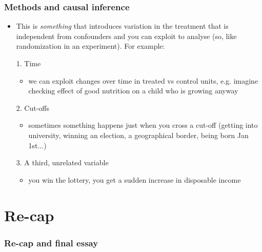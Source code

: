 \documentclass[aspectratio=43]{beamer}
\begin{document}
\begin{frame}
\frametitle{Methods and causal inference}
\centering

\begin{itemize}
  \item This is \textit{something} that introduces variation in the treatment that is independent from confounders and you can exploit to analyse (so, like randomization in an experiment). For example:
  \item[1.] Time
  \begin{itemize}
    \item we can exploit changes over time in treated vs control units, e.g. imagine checking effect of good nutrition on a child who is growing anyway
  \end{itemize}
  \item[2.] Cut-offs
  \begin{itemize}
    \item sometimes something happens just when you cross a cut-off (getting into university, winning an election, a geographical border, being born Jan 1st...)
  \end{itemize}
  \item[3.] A third, unrelated variable
  \begin{itemize}
    \item you win the lottery, you get a sudden increase in disposable income
  \end{itemize}
\end{itemize}

\end{frame}


\section{Re-cap}

\begin{frame}
\frametitle{Re-cap and final essay}
\centering



\end{frame}

\end{document}
